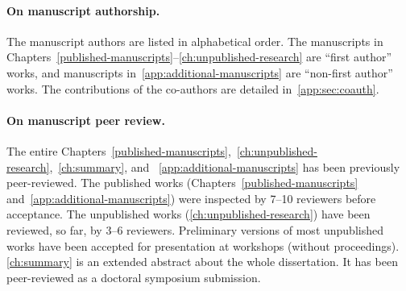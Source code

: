 \paragraph*{On manuscript authorship.}
The manuscript authors are listed in alphabetical order.
The manuscripts in Chapters~\ref{published-manuscripts}--\ref{ch:unpublished-research} are \enquote{first author} works,
and manuscripts in~\autoref{app:additional-manuscripts} are \enquote{non-first author} works.
The contributions of the co-authors are detailed in~\autoref{app:sec:coauth}.

\paragraph*{On manuscript peer review.}
The entire Chapters~\ref{published-manuscripts},~\ref{ch:unpublished-research},~\ref{ch:summary}, and ~\ref{app:additional-manuscripts}
has been previously peer-reviewed.
The published works (Chapters~\ref{published-manuscripts} and~\ref{app:additional-manuscripts}) were inspected by 7--10 reviewers before acceptance.
The unpublished works (\autoref{ch:unpublished-research}) have been reviewed, so far, by 3--6 reviewers.
Preliminary versions of most unpublished works have been accepted for presentation at workshops (without proceedings).
\autoref{ch:summary} is an extended abstract about the whole dissertation.
It has been peer-reviewed as a doctoral symposium submission.


